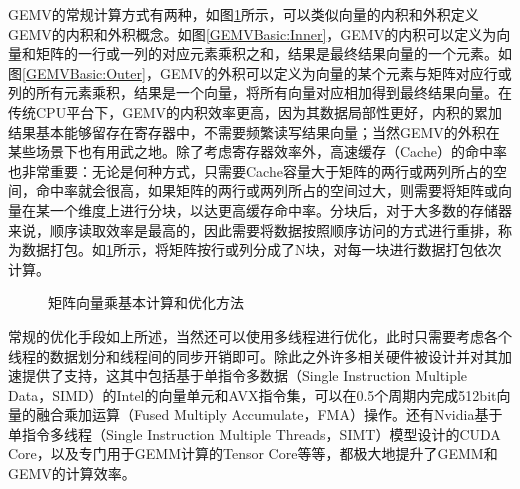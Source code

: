 GEMV的常规计算方式有两种，如图\ref{GEMVBasic}所示，可以类似向量的内积和外积定义GEMV的内积和外积概念。如图\ref{GEMVBasic:Inner}，GEMV的内积可以定义为向量和矩阵的一行或一列的对应元素乘积之和，结果是最终结果向量的一个元素。如图\ref{GEMVBasic:Outer}，GEMV的外积可以定义为向量的某个元素与矩阵对应行或列的所有元素乘积，结果是一个向量，将所有向量对应相加得到最终结果向量。在传统CPU平台下，GEMV的内积效率更高，因为其数据局部性更好，内积的累加结果基本能够留存在寄存器中，不需要频繁读写结果向量；当然GEMV的外积在某些场景下也有用武之地。除了考虑寄存器效率外，高速缓存（Cache）的命中率也非常重要：无论是何种方式，只需要Cache容量大于矩阵的两行或两列所占的空间，命中率就会很高，如果矩阵的两行或两列所占的空间过大，则需要将矩阵或向量在某一个维度上进行分块，以达更高缓存命中率。分块后，对于大多数的存储器来说，顺序读取效率是最高的，因此需要将数据按照顺序访问的方式进行重排，称为数据打包。如\ref{GEMVBasic}所示，将矩阵按行或列分成了N块，对每一块进行数据打包依次计算。

\begin{figure}[htbp!]
	\centering
	\label{GEMVBasic}
	\caption{矩阵向量乘基本计算和优化方法}
\end{figure}

常规的优化手段如上所述，当然还可以使用多线程进行优化，此时只需要考虑各个线程的数据划分和线程间的同步开销即可。除此之外许多相关硬件被设计并对其加速提供了支持，这其中包括基于单指令多数据（Single Instruction Multiple Data，SIMD）的Intel的向量单元和AVX指令集，可以在0.5个周期内完成512bit向量的融合乘加运算（Fused Multiply Accumulate，FMA）操作\cite{IntelAVX}。还有Nvidia基于单指令多线程（Single Instruction Multiple Threads，SIMT）模型设计的CUDA Core\cite{Cuda}，以及专门用于GEMM计算的Tensor Core\cite{TensorCore}等等，都极大地提升了GEMM和GEMV的计算效率。

